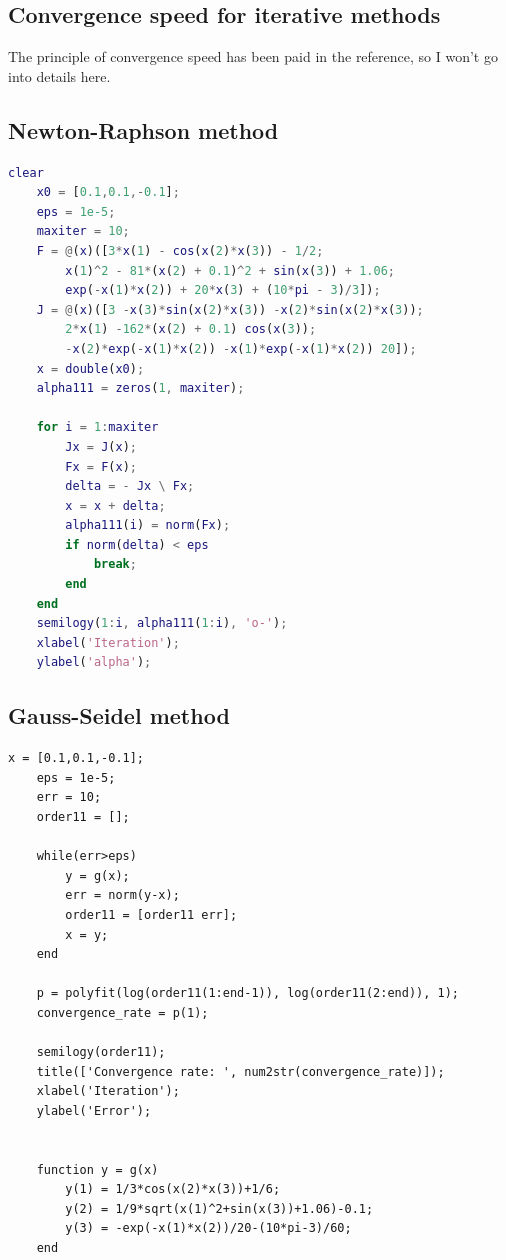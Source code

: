 \documentclass[12pt, a4paper, oneside]{ctexart}
\begin{document}
\begin{spacing}{2.0}
\section{Convergence speed for iterative methods}
The principle of convergence speed has been paid in the reference\cite{key1}, so I won't go into details here.
\subsection{Newton-Raphson method}
\begin{lstlisting}[language=Matlab, caption=Newton-Raphson method with Convergence speed for iterative methods] 
    clear
    x0 = [0.1,0.1,-0.1];
    eps = 1e-5;
    maxiter = 10;
    F = @(x)([3*x(1) - cos(x(2)*x(3)) - 1/2;
        x(1)^2 - 81*(x(2) + 0.1)^2 + sin(x(3)) + 1.06;
        exp(-x(1)*x(2)) + 20*x(3) + (10*pi - 3)/3]);
    J = @(x)([3 -x(3)*sin(x(2)*x(3)) -x(2)*sin(x(2)*x(3)); 
        2*x(1) -162*(x(2) + 0.1) cos(x(3));
        -x(2)*exp(-x(1)*x(2)) -x(1)*exp(-x(1)*x(2)) 20]);
    x = double(x0);
    alpha111 = zeros(1, maxiter);
    
    for i = 1:maxiter
        Jx = J(x);
        Fx = F(x);
        delta = - Jx \ Fx;
        x = x + delta;
        alpha111(i) = norm(Fx);
        if norm(delta) < eps
            break;
        end
    end
    semilogy(1:i, alpha111(1:i), 'o-');
    xlabel('Iteration');
    ylabel('alpha');    
\end{lstlisting}
\subsection{Gauss-Seidel method}
\begin{lstlisting}[caption=Gauss-Seidel method with Convergence speed for iterative methods] 
    x = [0.1,0.1,-0.1];
    eps = 1e-5;
    err = 10;
    order11 = [];
    
    while(err>eps)
        y = g(x);
        err = norm(y-x);
        order11 = [order11 err];
        x = y;
    end
    
    p = polyfit(log(order11(1:end-1)), log(order11(2:end)), 1);
    convergence_rate = p(1);
    
    semilogy(order11);
    title(['Convergence rate: ', num2str(convergence_rate)]);
    xlabel('Iteration');
    ylabel('Error');
    
    
    function y = g(x)
        y(1) = 1/3*cos(x(2)*x(3))+1/6;
        y(2) = 1/9*sqrt(x(1)^2+sin(x(3))+1.06)-0.1;
        y(3) = -exp(-x(1)*x(2))/20-(10*pi-3)/60;
    end
    


\end{lstlisting}
\end{spacing}
\end{document}
